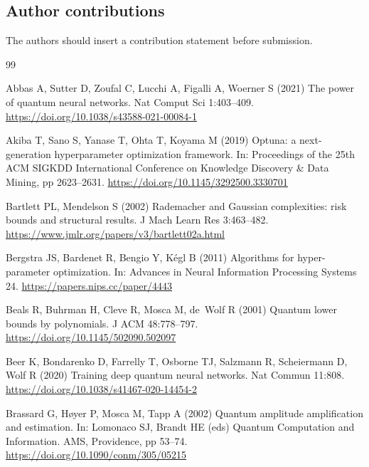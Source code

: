 \documentclass[pdflatex,sn-mathphys,NameDate,iicol]{sn-jnl}
\begin{document}
\subsection*{Author contributions}
The authors should insert a contribution statement before submission.

\begin{thebibliography}{99}

Abbas A, Sutter D, Zoufal C, Lucchi A, Figalli A, Woerner S (2021) The power
of quantum neural networks. Nat Comput Sci 1:403--409.
\url{https://doi.org/10.1038/s43588-021-00084-1}

Akiba T, Sano S, Yanase T, Ohta T, Koyama M (2019) Optuna: a next-generation
hyperparameter optimization framework. In: Proceedings of the 25th ACM SIGKDD
International Conference on Knowledge Discovery \& Data Mining, pp 2623--2631.
\url{https://doi.org/10.1145/3292500.3330701}

Bartlett PL, Mendelson S (2002) Rademacher and Gaussian complexities: risk
bounds and structural results. J Mach Learn Res 3:463--482.
\url{https://www.jmlr.org/papers/v3/bartlett02a.html}

Bergstra JS, Bardenet R, Bengio Y, K{\'e}gl B (2011) Algorithms for
hyper-parameter optimization. In: Advances in Neural Information Processing
Systems 24.
\url{https://papers.nips.cc/paper/4443}

Beals R, Buhrman H, Cleve R, Mosca M, de~Wolf R (2001) Quantum lower bounds
by polynomials. J ACM 48:778--797.
\url{https://doi.org/10.1145/502090.502097}

Beer K, Bondarenko D, Farrelly T, Osborne TJ, Salzmann R, Scheiermann D,
Wolf R (2020) Training deep quantum neural networks. Nat Commun 11:808.
\url{https://doi.org/10.1038/s41467-020-14454-2}

Brassard G, H{\o}yer P, Mosca M, Tapp A (2002) Quantum amplitude amplification
and estimation. In: Lomonaco SJ, Brandt HE (eds) Quantum Computation and
Information. AMS, Providence, pp 53--74.
\url{https://doi.org/10.1090/conm/305/05215}


\end{thebibliography}
\end{document}
